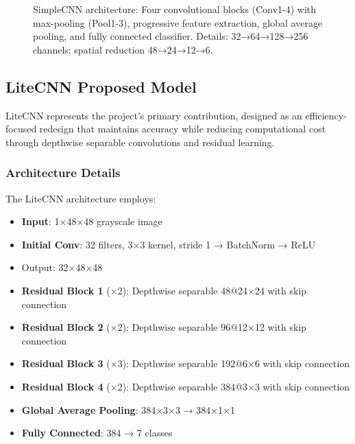 \documentclass[12pt,a4paper]{article}
\begin{document}
\begin{figure}[h!]
{}
    \caption{SimpleCNN architecture: Four convolutional blocks (Conv1-4) with max-pooling (Pool1-3), progressive feature extraction, global average pooling, and fully connected classifier. Details: 32→64→128→256 channels; spatial reduction 48→24→12→6.}
    \label{fig:simplecnn_arch}
\end{figure}

\subsection{LiteCNN Proposed Model}
LiteCNN represents the project's primary contribution, designed as an efficiency-focused redesign that maintains accuracy while reducing computational cost through depthwise separable convolutions and residual learning.

\subsubsection{Architecture Details}
The LiteCNN architecture employs:
\begin{itemize}[leftmargin=*]
    \item \textbf{Input}: 1×48×48 grayscale image
    \item \textbf{Initial Conv}: 32 filters, 3×3 kernel, stride 1 → BatchNorm → ReLU
    \item Output: 32×48×48
    \item \textbf{Residual Block 1} (×2): Depthwise separable 48@24×24 with skip connection
    \item \textbf{Residual Block 2} (×2): Depthwise separable 96@12×12 with skip connection  
    \item \textbf{Residual Block 3} (×3): Depthwise separable 192@6×6 with skip connection
    \item \textbf{Residual Block 4} (×2): Depthwise separable 384@3×3 with skip connection
    \item \textbf{Global Average Pooling}: 384×3×3 → 384×1×1
    \item \textbf{Fully Connected}: 384 → 7 classes
\end{itemize}
\end{document}
